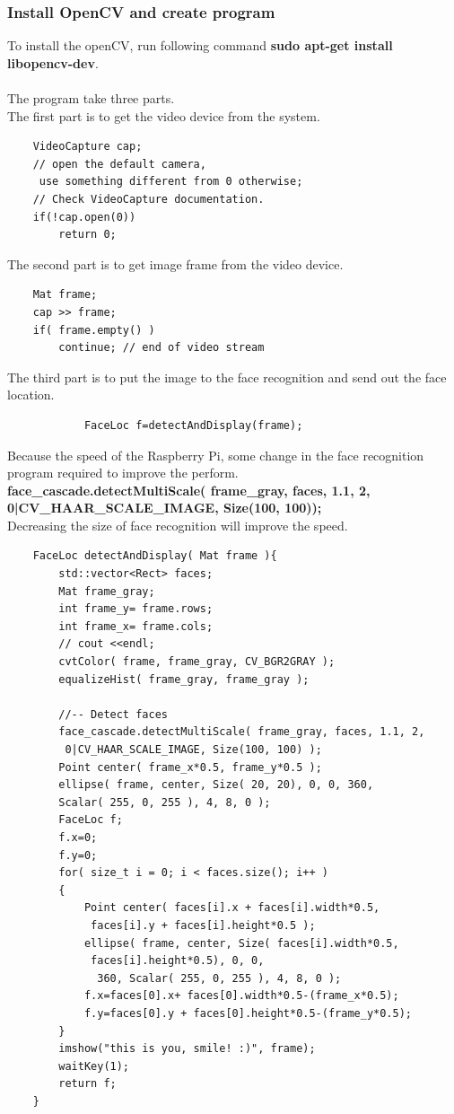 \documentclass{article}
\begin{document}
\subsubsection{Install OpenCV and create program}
	To install the openCV, run following command \textbf{sudo apt-get install libopencv-dev}.
	\\\\
	The program take three parts.\\
	The first part is to get the video device from the system.\\
		\begin{lstlisting}
	VideoCapture cap;
	// open the default camera,
	 use something different from 0 otherwise;
	// Check VideoCapture documentation.
	if(!cap.open(0))
		return 0;
		\end{lstlisting}
	The second part is to get image frame from the video device.
		\begin{lstlisting}
	Mat frame;
	cap >> frame;
	if( frame.empty() ) 
		continue; // end of video stream
		\end{lstlisting}
	The third part is to put the image to the face recognition and send out the face location.
		\begin{lstlisting}
			FaceLoc f=detectAndDisplay(frame);
		\end{lstlisting}
		Because the speed of the Raspberry Pi, some change in the face recognition program required to improve the perform.\\
		\textbf{face\_cascade.detectMultiScale( frame\_gray, faces, 1.1, 2, 0|CV\_HAAR\_SCALE\_IMAGE, Size(100, 100));}\\
		Decreasing the size of face recognition will improve the speed.
		\begin{lstlisting}
	FaceLoc detectAndDisplay( Mat frame ){
		std::vector<Rect> faces;
		Mat frame_gray;
		int frame_y= frame.rows;
		int frame_x= frame.cols;
		// cout <<endl; 
		cvtColor( frame, frame_gray, CV_BGR2GRAY );
		equalizeHist( frame_gray, frame_gray );
			
		//-- Detect faces
		face_cascade.detectMultiScale( frame_gray, faces, 1.1, 2,
		 0|CV_HAAR_SCALE_IMAGE, Size(100, 100) );
		Point center( frame_x*0.5, frame_y*0.5 );
		ellipse( frame, center, Size( 20, 20), 0, 0, 360, 
		Scalar( 255, 0, 255 ), 4, 8, 0 );
		FaceLoc f;
		f.x=0;
		f.y=0;
		for( size_t i = 0; i < faces.size(); i++ )
		{
			Point center( faces[i].x + faces[i].width*0.5,
			 faces[i].y + faces[i].height*0.5 );
			ellipse( frame, center, Size( faces[i].width*0.5,
			 faces[i].height*0.5), 0, 0,
			  360, Scalar( 255, 0, 255 ), 4, 8, 0 );
			f.x=faces[0].x+ faces[0].width*0.5-(frame_x*0.5);
			f.y=faces[0].y + faces[0].height*0.5-(frame_y*0.5);
		}
		imshow("this is you, smile! :)", frame);
		waitKey(1);
		return f;
	}
		\end{lstlisting}
\end{document}
